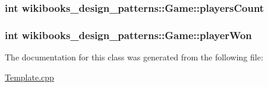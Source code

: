 \subsubsection[{\texorpdfstring{players\+Count}{playersCount}}]{\setlength{\rightskip}{0pt plus 5cm}int wikibooks\+\_\+design\+\_\+patterns\+::\+Game\+::players\+Count\hspace{0.3cm}{\ttfamily [protected]}}\hypertarget{classwikibooks__design__patterns_1_1Game_a8641adb02e0f068ff9ecb6c375562d7b}{}\label{classwikibooks__design__patterns_1_1Game_a8641adb02e0f068ff9ecb6c375562d7b}
\subsubsection[{\texorpdfstring{player\+Won}{playerWon}}]{\setlength{\rightskip}{0pt plus 5cm}int wikibooks\+\_\+design\+\_\+patterns\+::\+Game\+::player\+Won\hspace{0.3cm}{\ttfamily [protected]}}\hypertarget{classwikibooks__design__patterns_1_1Game_a6385d85f068769843e22f7741a4ae154}{}\label{classwikibooks__design__patterns_1_1Game_a6385d85f068769843e22f7741a4ae154}


The documentation for this class was generated from the following file\+:\begin{DoxyCompactItemize}
\item 
\hyperlink{Template_8cpp}{Template.\+cpp}\end{DoxyCompactItemize}
